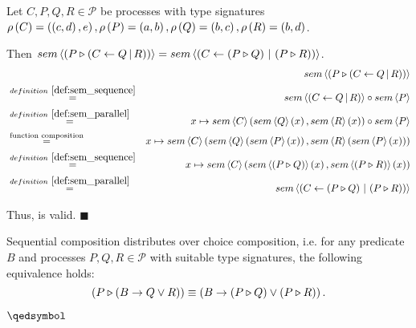 \begin{myproof}
Let $C, P, Q, R \in \mathcal{P}$ be processes with type signatures $\typesignature{C}{\left( c, d \right)}{e}, \typesignature{P}{a}{b}, \linebreak \typesignature{Q}{b}{c}, \typesignature{R}{b}{d}$.

Then $sem \left\langle \left( P \triangleright \left( C \gets Q \, | \, R \right) \right) \right\rangle = sem \left\langle \left( C \gets \left( P \triangleright Q \right) \, | \, \left( P \triangleright R \right) \right) \right\rangle$.
\begin{eqnarray*}
  & & \sem{\sequence{P}{\parallel{C}{Q}{R}}} \\
  & \overset{\defref{def:sem_sequence}}{=}   & \sem{\parallel{C}{Q}{R}} \circ \sem{P} \\
  & \overset{\defref{def:sem_parallel}}{=}   & x \mapsto \sem{C} \left( \sem{Q} \left( x \right), \sem{R} \left( x \right) \right) \circ \sem{P} \\
  & \overset{\text{function composition}}{=} & x \mapsto \sem{C} \left( \sem{Q} \left( \sem{P} \left( x \right) \right), \sem{R} \left( \sem{P} \left( x \right) \right) \right) \\
  & \overset{\defref{def:sem_sequence}}{=}   & x \mapsto \sem{C} \left( \sem{\sequence{P}{Q}} \left( x \right), \sem{\sequence{P}{R}} \left( x \right) \right) \\
  & \overset{\defref{def:sem_parallel}}{=}   & \sem{\parallel{C}{\sequence{P}{Q}}{\sequence{P}{R}}}
\end{eqnarray*}

\vspace*{-1em}
Thus,  is valid. \hfill$\blacksquare$
\end{myproof}


\begin{theorem}
\label{thm:distributivity_sequence_choice}
\text{} \linebreak Sequential composition distributes over choice composition, i.e. for any predicate $B$ and processes $P, Q, R \in \mathcal{P}$ with suitable type signatures, the following equivalence holds:
\begin{equation*}
  \left( P \triangleright \left( B \to Q \vee R \right) \right) \equiv \left( B \to \left( P \triangleright Q \right) \vee \left( P \triangleright R \right) \right).
\end{equation*}

\vspace*{-0.75em}
\hfill$\qedsymbol$
\end{theorem}

